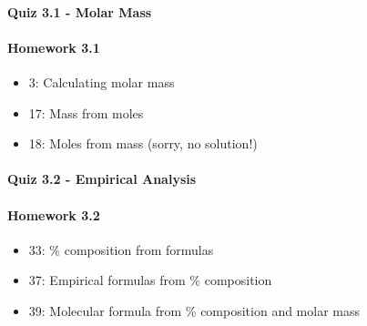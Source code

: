 \documentclass[12pt, openany, letterpaper]{memoir}
\begin{document}
\paragraph*{Quiz 3.1 - Molar Mass}
\paragraph*{Homework 3.1}
\begin{itemize}
  \item 3: Calculating molar mass
  \item 17: Mass from moles
  \item 18: Moles from mass (sorry, no solution!)
\end{itemize}

\paragraph*{Quiz 3.2 - Empirical Analysis}
\paragraph*{Homework 3.2}
\begin{itemize}
  \item 33: \% composition from formulas
  \item 37: Empirical formulas from \% composition
  \item 39: Molecular formula from \% composition and molar mass
\end{itemize}
\end{document}
